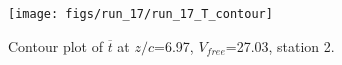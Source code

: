 \begin{figure}[H]
\centering
\texttt{[image: figs/run\_17/run\_17\_T\_contour]}
\caption{Contour plot of $\overline{t}$ at $z/c$=6.97, $V_{free}$=27.03, station 2.}
\label{fig:run_17_T_contour}
\end{figure}


